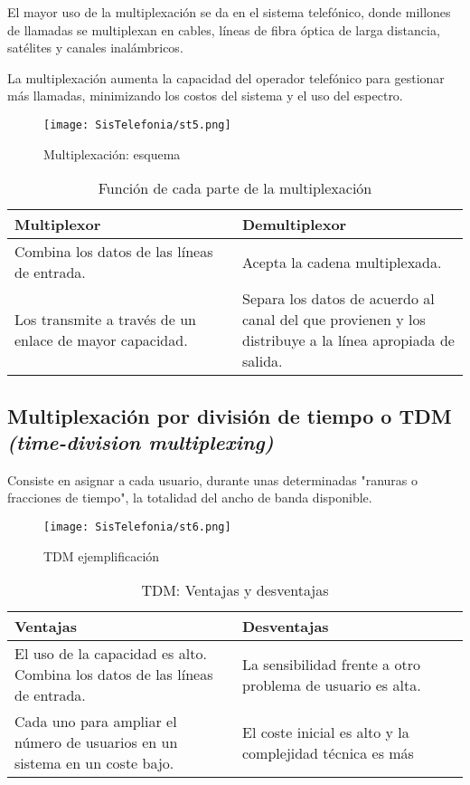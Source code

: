 \documentclass[11pt,fleqn]{book} %
\begin{document}
El mayor uso de la multiplexación se da en el sistema telefónico, donde millones de llamadas se multiplexan en cables, líneas de fibra óptica de larga distancia, satélites y canales inalámbricos.

La multiplexación aumenta la capacidad del operador telefónico para gestionar más llamadas, minimizando los costos del sistema y el uso del espectro.
\begin{figure}[ht]
\centering\texttt{[image: SisTelefonia/st5.png]}
\caption{Multiplexación: esquema}
\label{fig:Multiplexación: esquema}
\end{figure}
\begin{table}[ht]
\centering
\begin{tabular}{|m{0.5\linewidth}|m{0.5\linewidth}|}
\toprule
\textbf{Multiplexor} & \textbf{Demultiplexor}\\
\midrule
Combina los datos de las líneas de entrada.
 & Acepta la cadena multiplexada.\\
Los transmite a través de un enlace de  mayor capacidad.
 & Separa los datos de acuerdo al canal del que provienen y los distribuye a la línea apropiada de salida.
\\
\bottomrule
\end{tabular}
\caption{Función de cada parte de la multiplexación}
\label{tab:Función de cada parte de la multiplexación} 
\end{table}
\subsection{Multiplexación por división de tiempo o TDM \textit{(time-division multiplexing)}}
Consiste en asignar a cada usuario, durante unas determinadas "ranuras o fracciones de tiempo", la totalidad del ancho de banda disponible.
\begin{figure}[ht]
\centering\texttt{[image: SisTelefonia/st6.png]}
\caption{TDM ejemplificación}
\label{fig:TDM ejemplificación}
\end{figure}
\begin{table}[ht]
\centering
\begin{tabular}{|m{0.5\linewidth}|m{0.5\linewidth}|}
\toprule
\textbf{Ventajas} & \textbf{Desventajas}\\
\midrule
El uso de la capacidad es alto.
Combina los datos de las líneas de entrada.
 & La sensibilidad frente a otro problema de usuario es alta.\\
Cada uno para ampliar el número de usuarios en un sistema en un coste bajo.
 & El coste inicial es alto y la complejidad técnica es más
\\
\bottomrule
\end{tabular}
\caption{TDM: Ventajas y desventajas}
\label{tab:TDM: Ventajas y desventajas} 
\end{table}
\end{document}
